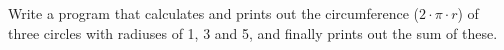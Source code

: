 Write a program that calculates and prints out the circumference ($2 \cdot \pi \cdot r$) of three circles with radiuses of 1, 3 and 5, and finally prints out the sum of these.
